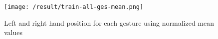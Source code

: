 \begin{figure}
	[h]
	\texttt{[image: /result/train-all-ges-mean.png]} \caption{Left and right hand position for each gesture using normalized mean values} \label{fg:ev:mean} 
\end{figure}
